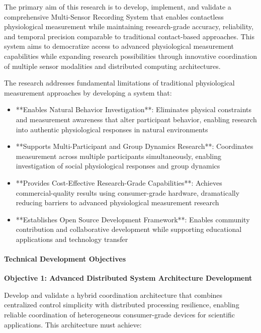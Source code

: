 \documentclass[11pt,a4paper]{report}
\begin{document}
The primary aim of this research is to develop, implement, and validate a comprehensive Multi-Sensor Recording System
that enables contactless physiological measurement while maintaining research-grade accuracy, reliability, and temporal
precision comparable to traditional contact-based approaches. This system aims to democratize access to advanced
physiological measurement capabilities while expanding research possibilities through innovative coordination of
multiple sensor modalities and distributed computing architectures.

The research addresses fundamental limitations of traditional physiological measurement approaches by developing a
system that:

\begin{itemize}
\item **Enables Natural Behavior Investigation**: Eliminates physical constraints and measurement awareness that alter
  participant behavior, enabling research into authentic physiological responses in natural environments
\item **Supports Multi-Participant and Group Dynamics Research**: Coordinates measurement across multiple participants
  simultaneously, enabling investigation of social physiological responses and group dynamics
\item **Provides Cost-Effective Research-Grade Capabilities**: Achieves commercial-quality results using consumer-grade
  hardware, dramatically reducing barriers to advanced physiological measurement research
\item **Establishes Open Source Development Framework**: Enables community contribution and collaborative development while
  supporting educational applications and technology transfer

\end{itemize}
\paragraph{Technical Development Objectives}

\textbf{Objective 1: Advanced Distributed System Architecture Development}

Develop and validate a hybrid coordination architecture that combines centralized control simplicity with distributed
processing resilience, enabling reliable coordination of heterogeneous consumer-grade devices for scientific
applications. This architecture must achieve:
\end{document}

